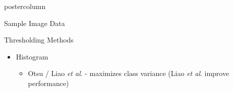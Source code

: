 \documentclass[final]{beamer}
\begin{document}
\begin{frame}
\begin{columns}
\begin{column}{.33\textwidth}
\begin{beamercolorbox}[center,wd=\textwidth]{postercolumn}
\begin{minipage}[T]{.95\textwidth}
{\begin{block}{Sample Image Data}
\begin{figure}
                 \quad
              \end{figure}
            \end{block}
            \vfill
            \begin{block}{Thresholding Methods}
              \begin{itemize}
              	\item Histogram
			\begin{itemize}
				\item Otsu / Liao \emph{et al}. - maximizes class variance (Liao \emph{et al}. improve performance)

\end{itemize}
\end{itemize}
\end{block}}
\end{minipage}
\end{beamercolorbox}
\end{column}
\end{columns}
\end{frame}
\end{document}
